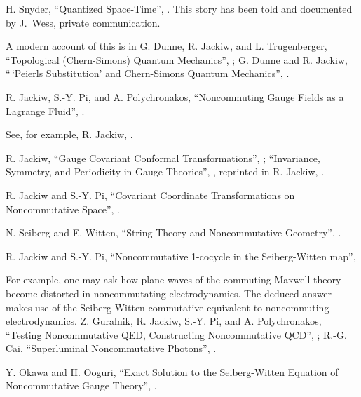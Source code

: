 \documentclass[a4paper,12pt,twoside]{article}
\begin{document}
\begin{thebibliography}{99}

H. Snyder, ``Quantized Space-Time'', . This story has been
told and documented by J.~Wess, private communication.

A modern account of this is in 
G. Dunne, R. Jackiw, and L. Trugenberger, ``Topological
(Chern-Simons) Quantum Mechanics'',
;
G. Dunne and R. Jackiw, ``\,`Peierls Substitution' and Chern-Simons  Quantum Mechanics'', 
.


R. Jackiw, S.-Y. Pi, and A. Polychronakos, ``Noncommuting Gauge Fields as a Lagrange Fluid'',
.

See, for example, 
R. Jackiw, . 

R. Jackiw,  ``Gauge Covariant Conformal Transformations'',
;
``Invariance, Symmetry, and Periodicity in Gauge Theories'',
, reprinted in
R. Jackiw, . 

R. Jackiw and S.-Y. Pi,  ``Covariant Coordinate Transformations on Noncommutative Space'',
.

N. Seiberg and E. Witten,  ``String Theory and Noncommutative Geometry'',
.

R. Jackiw and S.-Y. Pi, ``Noncommutative 1-cocycle in the Seiberg-Witten map'', 

For example, one may ask how plane waves of the commuting Maxwell theory become
distorted in noncommutating electrodynamics. The deduced answer makes use of the
Seiberg-Witten commutative equivalent to noncommuting electrodynamics.   Z. Guralnik, R.
Jackiw, S.-Y. Pi, and A. Polychronakos, ``Testing Noncommutative QED, Constructing
Noncommutative QCD'',
;  R.-G. Cai, ``Superluminal Noncommutative Photons'',
.

Y. Okawa and H. Ooguri, ``Exact Solution to the Seiberg-Witten Equation of Noncommutative
Gauge Theory'',
.





\end{thebibliography}
\end{document}
